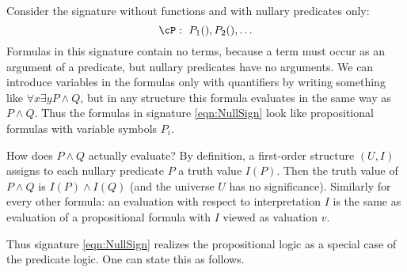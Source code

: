 

\setcounter{section}{1}
\setcounter{subsection}{5}
\setcounter{dfn}{14}

Consider the signature without functions and with nullary predicates only:
\begin{equation}
\label{eqn:NullSign}
\cP:\ P_1(), P_2(), \ldots
\end{equation}
Formulas in this signature contain no terms, because a term must occur as an argument of a predicate, but nullary predicates have no arguments.
We can introduce variables in the formulas only with quantifiers by writing something like $\forall x \exists y P \wedge Q$,
but in any structure this formula evaluates in the same way as $P \wedge Q$.
Thus the formulas in signature \eqref{eqn:NullSign} look like propositional formulas with variable symbols $P_i$.

How does $P \wedge Q$ actually evaluate?
By definition, a first-order structure $(U,I)$ assigns to each nullary predicate $P$ a truth value $I(P)$.
Then the truth value of $P \wedge Q$ is $I(P) \wedge I(Q)$ (and the universe $U$ has no significance).
Similarly for every other formula: an evaluation with respect to interpretation $I$ is the same as evaluation of a propositional formula
with $I$ viewed as valuation $v$.

Thus signature \eqref{eqn:NullSign} realizes the propositional logic as a special case of the predicate logic.
One can state this as follows.




